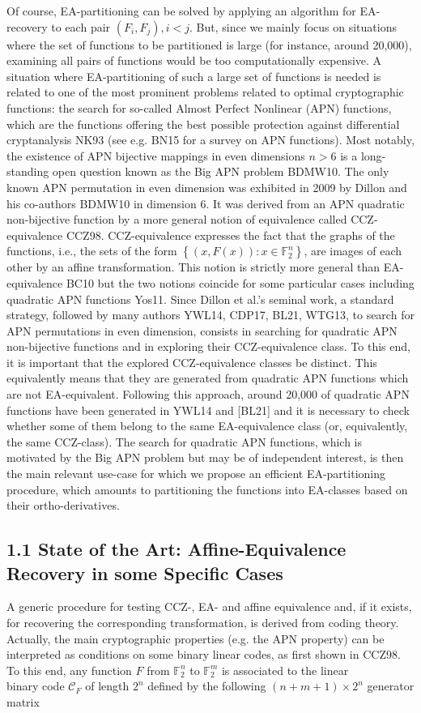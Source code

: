 \documentclass[10pt]{article}
\begin{document}
Of course, EA-partitioning can be solved by applying an algorithm for EA-recovery to each pair $\left(F_{i}, F_{j}\right), i<j$. But, since we mainly focus on situations where the set of functions to be partitioned is large (for instance, around 20,000), examining all pairs of functions would be too computationally expensive. A situation where EA-partitioning of such a large set of functions is needed is related to one of the most prominent problems related to optimal cryptographic functions: the search for so-called Almost Perfect Nonlinear (APN) functions, which are the functions offering the best possible protection against differential cryptanalysis NK93 (see e.g. BN15 for a survey on APN functions). Most notably, the existence of APN bijective mappings in even dimensions $n>6$ is a long-standing open question known as the Big APN problem BDMW10. The only known APN permutation in even dimension was exhibited in 2009 by Dillon and his co-authors BDMW10 in dimension 6. It was derived from an APN quadratic non-bijective function by a more general notion of equivalence called CCZ-equivalence CCZ98. CCZ-equivalence expresses the fact that the graphs of the functions, i.e., the sets of the form $\left\{(x, F(x)): x \in \mathbb{F}_{2}^{n}\right\}$, are images of each other by an affine transformation. This notion is strictly more general than EA-equivalence BC10 but the two notions coincide for some particular cases including quadratic APN functions Yos11. Since Dillon et al.'s seminal work, a standard strategy, followed by many authors YWL14, CDP17, BL21, WTG13, to search for APN permutations in even dimension, consists in searching for quadratic APN non-bijective functions and in exploring their CCZ-equivalence class. To this end, it is important that the explored CCZ-equivalence classes be distinct. This equivalently means that they are generated from quadratic APN functions which are not EA-equivalent. Following this approach, around 20,000 of quadratic APN functions have been generated in YWL14 and [BL21] and it is necessary to check whether some of them belong to the same EA-equivalence class (or, equivalently, the same CCZ-class). The search for quadratic APN functions, which is motivated by the Big APN problem but may be of independent interest, is then the main relevant use-case for which we propose an efficient EA-partitioning procedure, which amounts to partitioning the functions into EA-classes based on their ortho-derivatives.

\subsection*{1.1 State of the Art: Affine-Equivalence Recovery in some Specific Cases}
A generic procedure for testing CCZ-, EA- and affine equivalence and, if it exists, for recovering the corresponding transformation, is derived from coding theory. Actually, the main cryptographic properties (e.g. the APN property) can be interpreted as conditions on some binary linear codes, as first shown in CCZ98. To this end, any function $F$ from $\mathbb{F}_{2}^{n}$ to $\mathbb{F}_{2}^{m}$ is associated to the linear\\
binary code $\mathcal{C}_{F}$ of length $2^{n}$ defined by the following $(n+m+1) \times 2^{n}$ generator matrix
\end{document}
